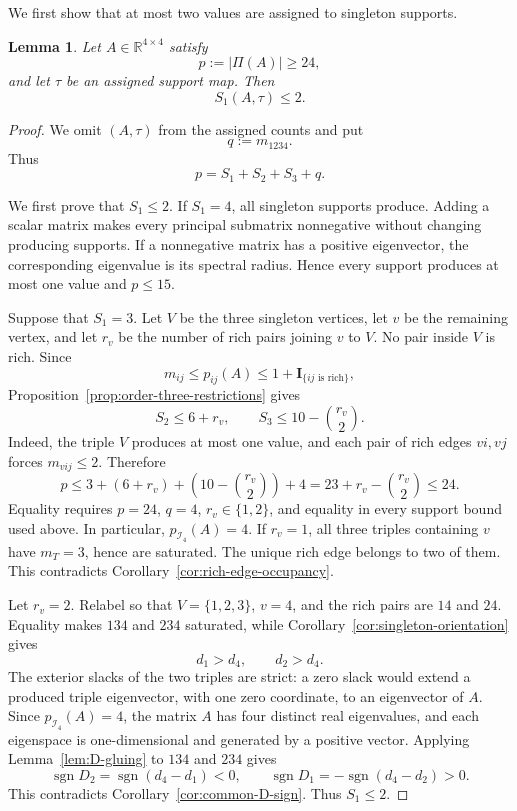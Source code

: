 \documentclass[11pt,a4paper]{article}
\newtheorem{lemma}[theorem]{Lemma}
\theoremstyle{definition}
\newcommand{\R}{\mathbb R}
\newcommand{\Ind}{\mathcal I}
\newcommand{\indic}{\mathbf I}
\DeclareMathOperator{\sgn}{sgn}
\begin{document}
We first show that at most two values are assigned to singleton
supports.

\begin{lemma}
\label{lem:large-spectrum-singletons}
Let $A\in\R^{4\times4}$ satisfy
$$
p:=|\Pi(A)|\geq24,
$$
and let $\tau$ be an assigned support map. Then
$$
S_1(A,\tau)\leq2.
$$
\end{lemma}

\begin{proof}
We omit $(A,\tau)$ from the assigned counts and put
$$
q:=m_{1234}.
$$
Thus
$$
p=S_1+S_2+S_3+q.
$$

We first prove that $S_1\leq2$. If $S_1=4$, all singleton supports
produce. Adding a scalar matrix makes every principal submatrix
nonnegative without changing producing supports. If a nonnegative
matrix has a positive eigenvector, the corresponding eigenvalue is its
spectral radius.
Hence every support produces at most one value and $p\leq15$.

Suppose that $S_1=3$. Let $V$ be the three singleton vertices, let $v$
be the remaining vertex, and let $r_v$ be the number of rich pairs
joining $v$ to $V$. No pair inside $V$ is rich. Since
$$
m_{ij}\leq p_{ij}(A)
\leq1+\indic_{\{ij\text{ is rich}\}},
$$
Proposition~\ref{prop:order-three-restrictions} gives
$$
S_2\leq6+r_v,
\qquad
S_3\leq10-\binom{r_v}{2}.
$$
Indeed, the triple $V$ produces at most one value, and each pair of
rich edges $vi,vj$ forces $m_{vij}\leq2$. Therefore
$$
p
\leq
3+(6+r_v)+\left(10-\binom{r_v}{2}\right)+4
=
23+r_v-\binom{r_v}{2}
\leq24.
$$
Equality requires $p=24$, $q=4$, $r_v\in\{1,2\}$, and equality in
every support bound used above. In particular,
$p_{\Ind_4}(A)=4$. If $r_v=1$, all three triples
containing $v$ have $m_T=3$, hence are saturated. The unique rich edge
belongs to two of them. This contradicts
Corollary~\ref{cor:rich-edge-occupancy}.

Let $r_v=2$. Relabel so that $V=\{1,2,3\}$, $v=4$, and the rich pairs
are $14$ and $24$. Equality makes $134$ and $234$ saturated, while
Corollary~\ref{cor:singleton-orientation} gives
$$
d_1>d_4,
\qquad
d_2>d_4.
$$
The exterior slacks of the two triples are strict: a zero slack would
extend a produced triple eigenvector, with one zero coordinate, to an
eigenvector of $A$. Since $p_{\Ind_4}(A)=4$, the matrix $A$ has four
distinct real eigenvalues, and each eigenspace is one-dimensional and
generated by a positive vector. Applying
Lemma~\ref{lem:D-gluing} to $134$ and $234$ gives
$$
\sgn D_2=\sgn(d_4-d_1)<0,
\qquad
\sgn D_1=-\sgn(d_4-d_2)>0.
$$
This contradicts Corollary~\ref{cor:common-D-sign}. Thus $S_1\leq2$.
\end{proof}
\end{document}
